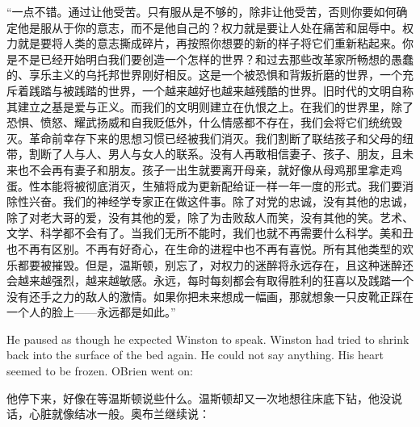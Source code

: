 \begin{paracol}{2}
``一点不错。通过让他受苦。只有服从是不够的，除非让他受苦，否则你要如何确定他是服从于你的意志，而不是他自己的？权力就是要让人处在痛苦和屈辱中。权力就是要将人类的意志撕成碎片，再按照你想要的新的样子将它们重新粘起来。你是不是已经开始明白我们要创造一个怎样的世界？和过去那些改革家所畅想的愚蠢的、享乐主义的乌托邦世界刚好相反。这是一个被恐惧和背叛折磨的世界，一个充斥着践踏与被践踏的世界，一个越来越好也越来越残酷的世界。旧时代的文明自称其建立之基是爱与正义。而我们的文明则建立在仇恨之上。在我们的世界里，除了恐惧、愤怒、耀武扬威和自我贬低外，什么情感都不存在，我们会将它们统统毁灭。革命前幸存下来的思想习惯已经被我们消灭。我们割断了联结孩子和父母的纽带，割断了人与人、男人与女人的联系。没有人再敢相信妻子、孩子、朋友，且未来也不会再有妻子和朋友。孩子一出生就要离开母亲，就好像从母鸡那里拿走鸡蛋。性本能将被彻底消灭，生殖将成为更新配给证一样一年一度的形式。我们要消除性兴奋。我们的神经学专家正在做这件事。除了对党的忠诚，没有其他的忠诚，除了对老大哥的爱，没有其他的爱，除了为击败敌人而笑，没有其他的笑。艺术、文学、科学都不会有了。当我们无所不能时，我们也就不再需要什么科学。美和丑也不再有区别。不再有好奇心，在生命的进程中也不再有喜悦。所有其他类型的欢乐都要被摧毁。但是，温斯顿，别忘了，对权力的迷醉将永远存在，且这种迷醉还会越来越强烈，越来越敏感。永远，每时每刻都会有取得胜利的狂喜以及践踏一个没有还手之力的敌人的激情。如果你把未来想成一幅画，那就想象一只皮靴正踩在一个人的脸上——永远都是如此。''

\switchcolumn*

He paused as though he expected Winston to speak. Winston had tried to
shrink back into the surface of the bed again. He could not say
anything. His heart seemed to be frozen. O\textquotesingle Brien went
on:

\switchcolumn

他停下来，好像在等温斯顿说些什么。温斯顿却又一次地想往床底下钻，他没说话，心脏就像结冰一般。奥布兰继续说：

\switchcolumn*


\end{paracol}
